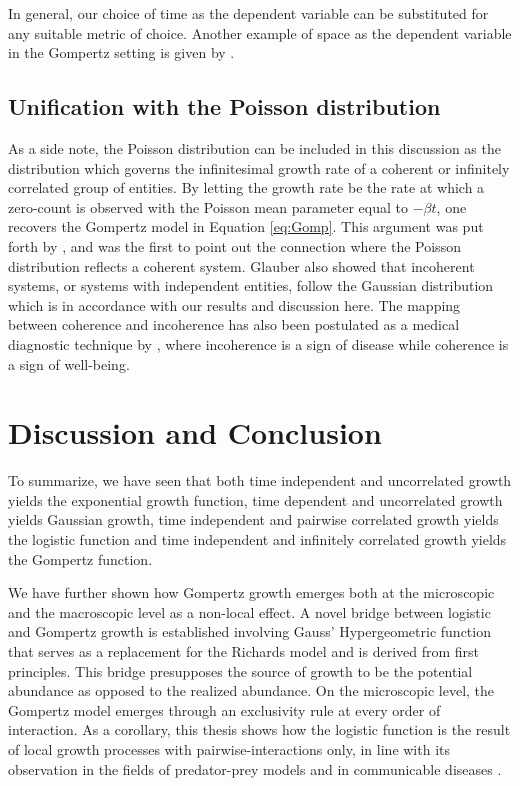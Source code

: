 \documentclass{article}
\begin{document}
In general, our choice of time as the dependent variable can be substituted for any suitable metric of choice. Another example of space as the dependent variable in the Gompertz setting is given by \citet{molski2003coherent}.

\subsection{Unification with the Poisson distribution}

As a side note, the Poisson distribution can be included in this discussion as the distribution which governs the infinitesimal growth rate of a coherent or infinitely correlated group of entities. By letting the growth rate be the rate at which a zero-count is observed with the Poisson mean parameter equal to $-\beta t$, one recovers the Gompertz model in Equation \ref{eq:Gomp}. This argument was put forth by \citet{shklovskii2005simple}, and \citet{glauber1963coherent} was the first to point out the connection where the Poisson distribution reflects a coherent system. Glauber also showed that incoherent systems, or systems with independent entities, follow the Gaussian distribution which is in accordance with our results and discussion here. The mapping between coherence and incoherence has also been postulated as a medical diagnostic technique by \citet{zhang1994log}, where incoherence is a sign of disease while coherence is a sign of well-being.

\section{Discussion and Conclusion}
\label{sec:discussion}

To summarize, we have seen that both time independent and uncorrelated growth yields the exponential growth function, time dependent and uncorrelated growth yields Gaussian growth, time independent and pairwise correlated growth yields the logistic function and time independent and infinitely correlated growth yields the Gompertz function. 

We have further shown how Gompertz growth emerges both at the microscopic and the macroscopic level as a non-local effect. A novel bridge between logistic and Gompertz growth is established involving Gauss' Hypergeometric function that serves as a replacement for the Richards model and is derived from first principles. This bridge presupposes the source of growth to be the potential abundance as opposed to the realized abundance. On the microscopic level, the Gompertz model emerges through an exclusivity rule at every order of interaction. As a corollary, this thesis shows how the logistic function is the result of local growth processes with pairwise-interactions only, in line with its observation in the fields of predator-prey models and in communicable diseases \cite{may2007theoretical}. 
\end{document}
